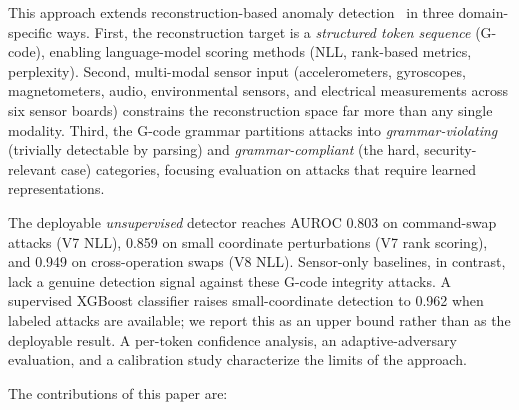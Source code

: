 This approach extends reconstruction-based anomaly detection~\cite{an2015variational,chalapathy2019deep} in three domain-specific ways.
First, the reconstruction target is a \emph{structured token sequence} (G-code), enabling language-model scoring methods (NLL, rank-based metrics, perplexity).
Second, multi-modal sensor input (accelerometers, gyroscopes, magnetometers, audio, environmental sensors, and electrical measurements across six sensor boards) constrains the reconstruction space far more than any single modality.
Third, the G-code grammar partitions attacks into \emph{grammar-violating} (trivially detectable by parsing) and \emph{grammar-compliant} (the hard, security-relevant case) categories, focusing evaluation on attacks that require learned representations.

The deployable \emph{unsupervised} detector reaches AUROC 0.803 on command-swap attacks (V7 NLL), 0.859 on small coordinate perturbations (V7 rank scoring), and 0.949 on cross-operation swaps (V8 NLL).
Sensor-only baselines, in contrast, lack a genuine detection signal against these G-code integrity attacks.
A supervised XGBoost classifier raises small-coordinate detection to 0.962 when labeled attacks are available; we report this as an upper bound rather than as the deployable result.
A per-token confidence analysis, an adaptive-adversary evaluation, and a calibration study characterize the limits of the approach.

The contributions of this paper are:

